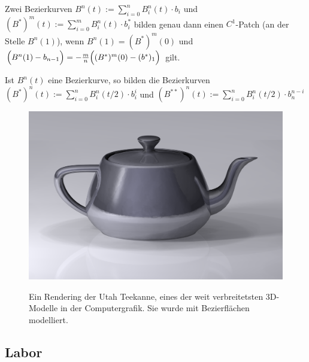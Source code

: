 \begin{Bemerkung}
Zwei Bezierkurven   $B^n(t) := \sum_{i = 0}^{n} B_i^n(t) \cdot  b_i$ und $(B^*)^m(t) := \sum_{i = 0}^{m} B_i^n(t) \cdot  b^*_i$ bilden genau dann einen $C^1$-Patch  (an der Stelle $B^n(1)$), wenn 
$B^n(1) = (B^*)^m(0)$ und $\Bigl(B^n(1) - b_{n-1} \Bigr)= - \frac{m}{n}  \Bigl((B^*)^m(0) - (b^*)_1 \Bigr)$ gilt.
\end{Bemerkung}


 


\begin{Definition}
Ist  $B^n(t)$ eine Bezierkurve, so bilden die Bezierkurven $(B^{*})^n(t)  :=  \sum_{i = 0}^{n} B_i^n(t/2) \cdot  b_i^i$ und  $(B^{**})^n(t)  :=  \sum_{i = 0}^{n} B_i^n(t/2) \cdot  b_n^{n-i}$
\end{Definition}

\begin{figure}[H]
    \centering
    \includegraphics[scale=0.1]{images/Utah_teapot.png}
    \label{fig:rendering-utah-teapot}
    \caption[Ein Rendering der Utah Teekanne]{Ein Rendering der Utah Teekanne, eines der weit verbreitetsten 3D-Modelle in der Computergrafik. Sie wurde mit Bezierflächen modelliert.}
\end{figure}




\subsection{Labor}